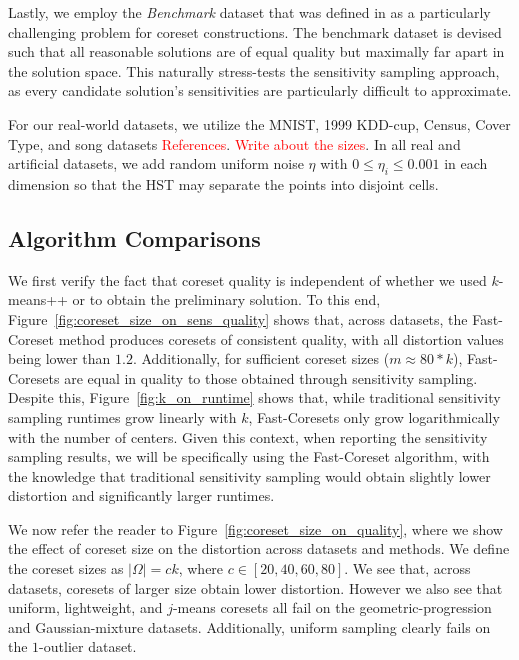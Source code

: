 Lastly, we employ the \emph{Benchmark} dataset that was defined in \cite{chrisESA} as a particularly challenging problem for coreset constructions.  The
benchmark dataset is devised such that all reasonable solutions are of equal quality but maximally far apart in the solution space. This naturally stress-tests
the sensitivity sampling approach, as every candidate solution's sensitivities are particularly difficult to approximate.

For our real-world datasets, we utilize the MNIST, 1999 KDD-cup, Census, Cover Type, and song datasets \textcolor{red}{References}. \textcolor{red}{Write about the sizes}. In all real and
artificial datasets, we add random uniform noise $\eta$ with $0 \leq \eta_i \leq 0.001$ in each dimension so that the HST may separate the points into disjoint
cells.

\subsection{Algorithm Comparisons}
\label{ssec:alg_qualities}

We first verify the fact that coreset quality is independent of whether we used $k$-means++ or \fkmeans to obtain the preliminary solution. To this end,
Figure~\ref{fig:coreset_size_on_sens_quality} shows that, across datasets, the Fast-Coreset method produces coresets of consistent quality, with all distortion
values being lower than $1.2$. Additionally, for sufficient coreset sizes ($m \approx 80 * k$), Fast-Coresets are equal in quality to those obtained through
sensitivity sampling. Despite this, Figure~\ref{fig:k_on_runtime} shows that, while traditional sensitivity sampling runtimes grow linearly with $k$,
Fast-Coresets only grow logarithmically with the number of centers. Given this context, when reporting the sensitivity sampling results, we will be
specifically using the Fast-Coreset algorithm, with the knowledge that traditional sensitivity sampling would obtain slightly lower distortion and significantly
larger runtimes.

We now refer the reader to Figure~\ref{fig:coreset_size_on_quality}, where we show the effect of coreset size on the distortion across datasets and methods.
We define the coreset sizes as $|\Omega| = ck$, where $c \in [20, 40, 60, 80]$. We see that, across datasets, coresets of larger size obtain lower distortion. However
we also see that uniform, lightweight, and $j$-means coresets all fail on the geometric-progression and Gaussian-mixture datasets. Additionally, uniform
sampling clearly fails on the $1$-outlier dataset.




